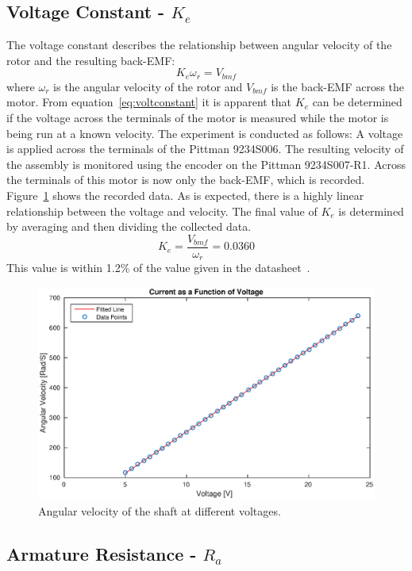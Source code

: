 \subsection{Voltage Constant - $K_e$}
\label{sec:voltconstat}
The voltage constant describes the relationship between angular velocity of the rotor and the resulting back-EMF:
\begin{equation}
	\label{eq:voltconstant}
	K_e\omega_r = V_{bmf}
\end{equation}
where $\omega_r$ is the angular velocity of the rotor and $V_{bmf}$ is the back-EMF across the motor.
From equation~\ref{eq:voltconstant} it is apparent that $K_e$ can be determined if the voltage across the terminals of the motor is measured while the motor is being run at a known velocity.
The experiment is conducted as follows:
A voltage is applied across the terminals of the Pittman 9234S006.
The resulting velocity of the assembly is monitored using the encoder on the Pittman 9234S007-R1.
Across the terminals of this motor is now only the back-EMF, which is recorded.
Figure~\ref{fig:velvsvolt} shows the recorded data. 
As is expected, there is a highly linear relationship between the voltage and velocity.
The final value of $K_e$ is determined by averaging and then dividing the collected data.
$$K_e=\frac{V_{bmf}}{\omega_r}=0.0360$$
This value is within 1.2\% of the value given in the datasheet~\cite{pittmann}.

\begin{figure}[!h]
	\centering
	\includegraphics[width=.75\linewidth]{graphics/vvsrpm}
	\caption{Angular velocity of the shaft at different voltages.}
	\label{fig:velvsvolt}
\end{figure}

\subsection{Armature Resistance - $R_a$}
\label{sec:armature}
